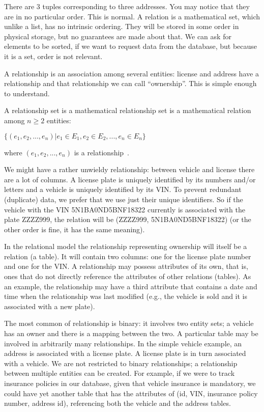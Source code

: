 \documentclass[a4paper]{report}
\begin{document}
There are 3 tuples corresponding to three addresses. You may notice that they are in no particular order. This is normal. A relation is a mathematical set, which unlike a list, has no intrinsic ordering. They will be stored in some order in physical storage, but no guarantees are made about that. We can ask for elements to be sorted, if we want to request data from the database, but because it is a set, order is not relevant.

A relationship is an association among several entities: license and address have a relationship and that relationship we can call ``ownership''. This is simple enough to understand.

A relationship set is a mathematical relationship set is a mathematical relation among $n \geq 2$ entities:

\begin{center}
 $\{(e_{1}, e_{2}, ..., e_{n}) | e_{1} \in E_{1}, e_{2} \in E_{2}, ..., e_{n} \in E_{n}\}$
\end{center}

where $(e_{1}, e_{2}, ..., e_{n})$ is a relationship~\cite{dsc}. 

We might have a rather unwieldy relationship: between vehicle and license there are a lot of columns. A license plate is uniquely identified by its numbers and/or letters and a vehicle is uniquely identified by its VIN. To prevent redundant (duplicate) data, we prefer that we use just their unique identifiers. So if the vehicle with the VIN 5N1BA0ND5BNF18322 currently is associated with the plate ZZZZ999, the relation will be (ZZZZ999, 5N1BA0ND5BNF18322) (or the other order is fine, it has the same meaning).

In the relational model the relationship representing ownership will itself be a relation (a table). It will contain two columns: one for the license plate number and one for the VIN. A relationship may possess attributes of its own, that is, ones that do not directly reference the attributes of other relations (tables). As an example, the relationship may have a third attribute that contains a date and time when the relationship was last modified (e.g., the vehicle is sold and it is associated with a new plate).

The most common of relationship is binary: it involves two entity sets; a vehicle has an owner and there is a mapping between the two. A particular table may be involved in arbitrarily many relationships. In the simple vehicle example, an address is associated with a license plate. A license plate is in turn associated with a vehicle. We are not restricted to binary relationships; a relationship between multiple entities can be created. For example, if we were to track insurance policies in our database, given that vehicle insurance is mandatory, we could have yet another table that has the attributes of (id, VIN, insurance policy number, address id), referencing both the vehicle and the address tables. 
\end{document}
